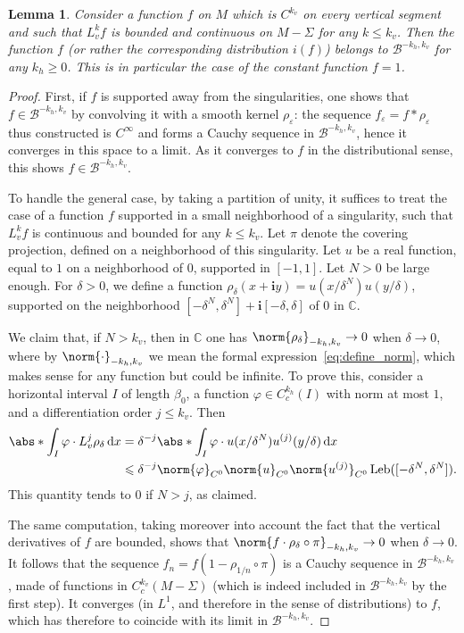 \documentclass[11pt, a4paper, oneside, final, pagebackref]{amsart}
\newcommand{\boB}{\mathcal{B}}
\newcommand{\C}{\mathbb{C}}
\newcommand{\dd}{\mathop{}\!\mathrm{d}}
\newcommand{\ic}{\mathbf{i}}
\DeclareMathOperator{\Leb}{Leb}
\renewcommand{\epsilon}{\varepsilon}
\renewcommand{\phi}{\varphi}
\renewcommand{\leq}{\leqslant}
\renewcommand{\geq}{\geqslant}
\newtheorem{lem}[thm]{Lemma}
\theoremstyle{definition}
\numberwithin{equation}{section}
\begin{document}
\begin{lem}
\label{lem:boB_riche} Consider a function $f$ on $M$ which is $C^{k_v}$ on
every vertical segment and such that $L_v^k f$ is bounded and continuous on
$M-\Sigma$ for any $k \leq k_v$. Then the function $f$ (or rather the
corresponding distribution $i(f)$) belongs to $\boB^{-k_h, k_v}$ for any
$k_h\geq 0$. This is in particular the case of the constant function $f=1$.
\end{lem}
\begin{proof}
First, if $f$ is supported away from the singularities, one shows that $f \in
\boB^{-k_h, k_v}$ by convolving it with a smooth kernel $\rho_\epsilon$:
the sequence $f_\epsilon = f * \rho_\epsilon$ thus constructed is $C^\infty$ and forms
a Cauchy sequence in $\boB^{-k_h, k_v}$, hence it converges in this space to a limit.
As it converges to $f$ in the distributional sense, this shows $f \in \boB^{-k_h, k_v}$.


To handle the general case, by taking a partition of unity, it suffices to
treat the case of a function $f$ supported in a small neighborhood of a
singularity, such that $L_v^k f$ is continuous and bounded for any $k \leq
k_v$. Let $\pi$ denote the covering projection, defined on a neighborhood of
this singularity. Let $u$ be a real function, equal to $1$ on a neighborhood
of $0$, supported in $[-1,1]$. Let $N>0$ be large enough. For $\delta > 0$,
we define a function $\rho_\delta(x+ \ic y) = u(x/\delta^N) u(y/\delta)$,
supported on the neighborhood $[-\delta^N, \delta^N] + \ic [-\delta, \delta]$
of $0$ in $\C$.

We claim that, if $N>k_v$, then in $\C$ one has $\norm{\rho_\delta}_{-k_h,
k_v} \to 0$ when $\delta \to 0$, where by $\norm{\cdot}_{-k_h, k_v}$ we mean the formal
expression~\eqref{eq:define_norm}, which makes sense for any function but could be
infinite. To prove this, consider a horizontal
interval $I$ of length $\beta_0$, a function $\phi \in C_c^{k_h}(I)$ with
norm at most $1$, and a differentiation order $j \leq k_v$. Then
\begin{align*}
  \abs*{\int_I \phi \cdot L_v^j \rho_\delta \dd x}
  &= \delta^{-j} \abs*{\int_I \phi \cdot u(x/\delta^N) u^{(j)}(y/\delta) \dd x}
  \\&\leq \delta^{-j} \norm{\phi}_{C^0} \norm{u}_{C^0} \norm{u^{(j)}}_{C^0} \Leb([-\delta^N, \delta^N]).
\end{align*}
This quantity tends to $0$ if $N>j$, as claimed.

The same computation, taking moreover into account the fact that the vertical
derivatives of $f$ are bounded, shows that $\norm{f \cdot \rho_\delta\circ
\pi}_{-k_h, k_v} \to 0$ when $\delta \to 0$. It follows that the sequence
$f_n = f (1- \rho_{1/n} \circ \pi)$ is a Cauchy sequence in $\boB^{-k_h,
k_v}$, made of functions in $C^{k_v}_c(M-\Sigma)$ (which is indeed included
in $\boB^{-k_h, k_v}$ by the first step). It converges (in $L^1$,
and therefore in the sense of distributions) to $f$, which has therefore to
coincide with its limit in $\boB^{-k_h, k_v}$.
\end{proof}
\end{document}

